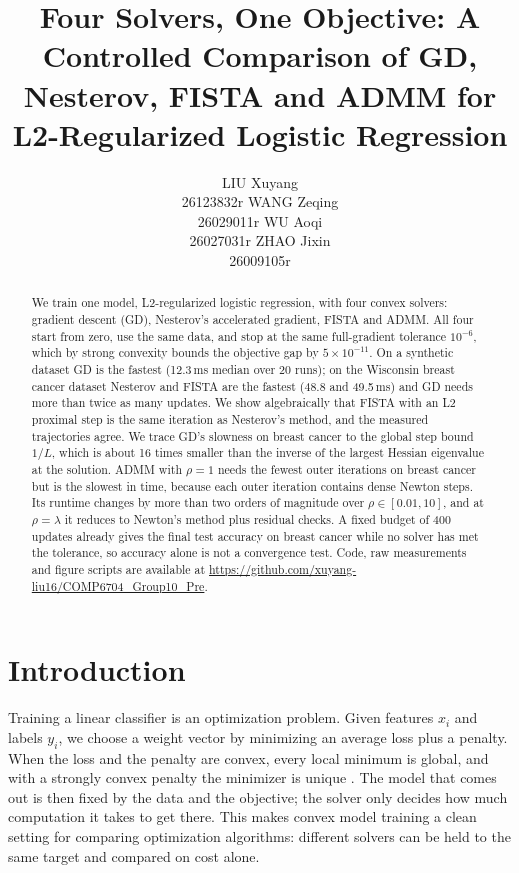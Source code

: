 \documentclass{article}
\title{Four Solvers, One Objective: A Controlled Comparison of GD, Nesterov, FISTA and ADMM for L2-Regularized Logistic Regression}
\author{%
  LIU Xuyang\\ 26123832r \And
  WANG Zeqing\\ 26029011r \And
  WU Aoqi\\ 26027031r \And
  ZHAO Jixin\\ 26009105r
}
\begin{document}
\maketitle

\begin{abstract}
We train one model, L2-regularized logistic regression, with four convex solvers: gradient descent (GD), Nesterov's accelerated gradient, FISTA and ADMM. All four start from zero, use the same data, and stop at the same full-gradient tolerance $10^{-6}$, which by strong convexity bounds the objective gap by $5\times10^{-11}$. On a synthetic dataset GD is the fastest (12.3\,ms median over 20 runs); on the Wisconsin breast cancer dataset Nesterov and FISTA are the fastest (48.8 and 49.5\,ms) and GD needs more than twice as many updates. We show algebraically that FISTA with an L2 proximal step is the same iteration as Nesterov's method, and the measured trajectories agree. We trace GD's slowness on breast cancer to the global step bound $1/L$, which is about 16 times smaller than the inverse of the largest Hessian eigenvalue at the solution. ADMM with $\rho=1$ needs the fewest outer iterations on breast cancer but is the slowest in time, because each outer iteration contains dense Newton steps. Its runtime changes by more than two orders of magnitude over $\rho\in[0.01,10]$, and at $\rho=\lambda$ it reduces to Newton's method plus residual checks. A fixed budget of 400 updates already gives the final test accuracy on breast cancer while no solver has met the tolerance, so accuracy alone is not a convergence test. Code, raw measurements and figure scripts are available at \url{https://github.com/xuyang-liu16/COMP6704_Group10_Pre}.
\end{abstract}

\section{Introduction}
\label{sec:intro}

Training a linear classifier is an optimization problem. Given features $x_i$ and labels $y_i$, we choose a weight vector by minimizing an average loss plus a penalty. When the loss and the penalty are convex, every local minimum is global, and with a strongly convex penalty the minimizer is unique \citep{boyd2004convex}. The model that comes out is then fixed by the data and the objective; the solver only decides how much computation it takes to get there. This makes convex model training a clean setting for comparing optimization algorithms: different solvers can be held to the same target and compared on cost alone.
\end{document}
